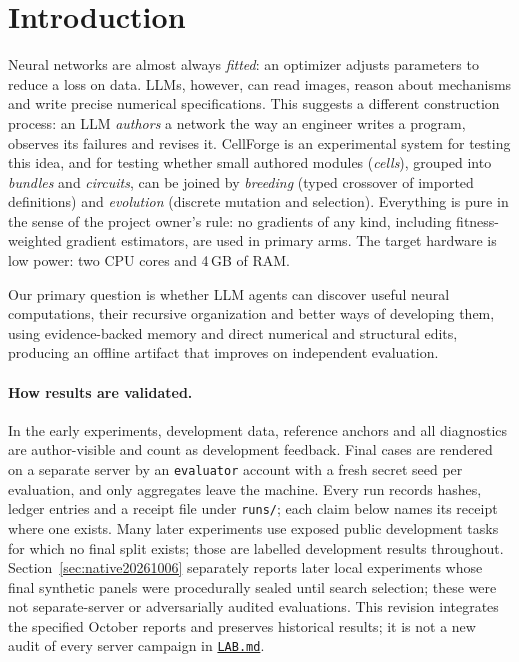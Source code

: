\documentclass[11pt]{article}
\begin{document}
\section{Introduction}
Neural networks are almost always \emph{fitted}: an optimizer adjusts parameters to reduce a
loss on data. LLMs, however, can read images, reason about mechanisms and write precise
numerical specifications. This suggests a different construction process: an LLM
\emph{authors} a network the way an engineer writes a program, observes its failures and
revises it. CellForge is an experimental system for testing this idea, and for testing whether
small authored modules (\emph{cells}), grouped into \emph{bundles} and \emph{circuits}, can be
joined by \emph{breeding} (typed crossover of imported definitions) and \emph{evolution}
(discrete mutation and selection). Everything is pure in the sense of the project owner's rule:
no gradients of any kind, including fitness-weighted gradient estimators, are used in primary
arms. The target hardware is low power: two CPU cores and 4\,GB of RAM.

Our primary question is whether LLM agents can discover useful neural computations, their
recursive organization and better ways of developing them, using evidence-backed memory and
direct numerical and structural edits, producing an offline artifact that improves on
independent evaluation.

\paragraph{How results are validated.} In the early experiments, development data, reference anchors and all
diagnostics are author-visible and count as development feedback. Final cases are rendered on a
separate server by an \texttt{evaluator} account with a fresh secret seed per evaluation, and
only aggregates leave the machine. Every run records hashes, ledger entries and a receipt file
under \texttt{runs/}; each claim below names its receipt where one exists. Many later experiments
use exposed public development tasks for which no final split exists; those are labelled
development results throughout. Section~\ref{sec:native20261006} separately reports later local
experiments whose final synthetic panels were procedurally sealed until search selection; these
were not separate-server or adversarially audited evaluations. This revision integrates the
specified October reports and preserves historical results; it is not a new audit of every
server campaign in \href{https://github.com/Sanokei/CellForge/blob/02beaf18251fca5ed1f1eb55e92f00a3e3820e88/LAB.md}{\texttt{LAB.md}}.
\end{document}

